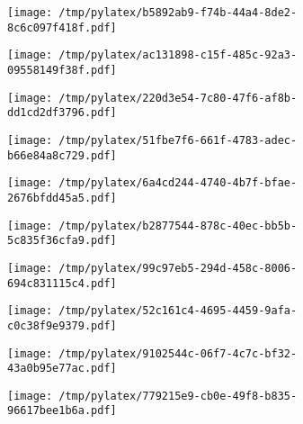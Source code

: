 \documentclass{article}
\begin{document}
\begin{figure}[htbp]
\begin{subfigure}[b]{.3\linewidth}
\texttt{[image: /tmp/pylatex/b5892ab9-f74b-44a4-8de2-8c6c097f418f.pdf]}
\end{subfigure}
\begin{subfigure}[b]{.3\linewidth}
\texttt{[image: /tmp/pylatex/ac131898-c15f-485c-92a3-09558149f38f.pdf]}
\end{subfigure}
\begin{subfigure}[b]{.3\linewidth}
\texttt{[image: /tmp/pylatex/220d3e54-7c80-47f6-af8b-dd1cd2df3796.pdf]}
\end{subfigure}
\begin{subfigure}[b]{.3\linewidth}
\texttt{[image: /tmp/pylatex/51fbe7f6-661f-4783-adec-b66e84a8c729.pdf]}
\end{subfigure}
\begin{subfigure}[b]{.3\linewidth}
\texttt{[image: /tmp/pylatex/6a4cd244-4740-4b7f-bfae-2676bfdd45a5.pdf]}
\end{subfigure}
\begin{subfigure}[b]{.3\linewidth}
\texttt{[image: /tmp/pylatex/b2877544-878c-40ec-bb5b-5c835f36cfa9.pdf]}
\end{subfigure}
\begin{subfigure}[b]{.3\linewidth}
\texttt{[image: /tmp/pylatex/99c97eb5-294d-458c-8006-694c831115c4.pdf]}
\end{subfigure}
\begin{subfigure}[b]{.3\linewidth}
\texttt{[image: /tmp/pylatex/52c161c4-4695-4459-9afa-c0c38f9e9379.pdf]}
\end{subfigure}
\begin{subfigure}[b]{.3\linewidth}
\texttt{[image: /tmp/pylatex/9102544c-06f7-4c7c-bf32-43a0b95e77ac.pdf]}
\end{subfigure}
\begin{subfigure}[b]{.3\linewidth}
\texttt{[image: /tmp/pylatex/779215e9-cb0e-49f8-b835-96617bee1b6a.pdf]}
\end{subfigure}
\end{figure}
\end{document}

